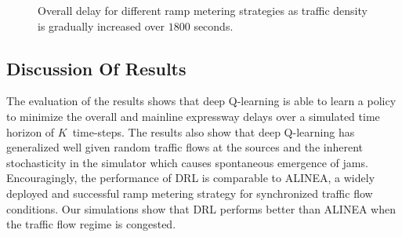 \documentclass[conference]{IEEEtran}
\begin{document}
\begin{figure}[!t]
	\centering
	\qquad
	\caption{Overall delay for different ramp metering strategies as traffic density is gradually increased over $1800$ seconds.}
	\label{fig:density-delay}
\end{figure}



\subsection{Discussion Of Results}
\label{subsec:results-discussion}


The evaluation of the results shows that deep Q-learning is able to learn a policy to minimize the overall and mainline expressway delays over a simulated time horizon of $K$~time-steps. The results also show that deep Q-learning has generalized well given random traffic flows at the sources and the inherent stochasticity in the simulator which causes spontaneous emergence of jams. Encouragingly, the performance of \ac{DRL} is comparable to ALINEA, a widely deployed and successful ramp metering strategy for synchronized traffic flow conditions. Our simulations show that \ac{DRL} performs better than ALINEA when the traffic flow regime is congested.   
\end{document}
